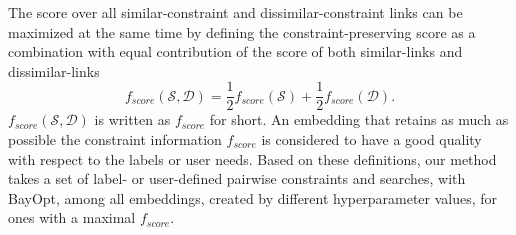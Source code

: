 The score over all similar-constraint and dissimilar-constraint links can be maximized at the same time by defining the constraint-preserving score as a combination with equal contribution of the score of both similar-links and dissimilar-links 
\begin{equation}
f_{score}(\mathcal{S},\mathcal{D}) = \frac{1}{2}f_{score}(\mathcal{S}) + \frac{1}{2}f_{score}(\mathcal{D}).
\end{equation}
$f_{score}(\mathcal{S},\mathcal{D})$ is written as $f_{score}$ for short.
An embedding that retains as much as possible the constraint information $f_{score}$ is considered to have a good quality with respect to the labels or user needs.
Based on these definitions, our method takes a set of label- or user-defined pairwise constraints and searches, with BayOpt, among all embeddings, created by different hyperparameter values, for ones with a maximal $f_{score}$.

